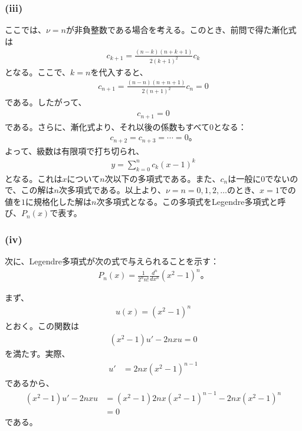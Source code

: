 \documentclass[platex,dvipdfmx,a4paper]{jsarticle}
\newcommand{\ssum}[3]{\sum_{#1=#2}^#3}
\begin{document}
  \subsubsection*{(iii)}
  
  ここでは、$\nu=n$が非負整数である場合を考える。このとき、前問で得た漸化式は
  \begin{align*}
    c_{k+1}
    =
    \frac{(n-k)(n+k+1)}{2(k+1)^2}c_k
  \end{align*}
  となる。ここで、$k=n$を代入すると、
  \begin{align*}
    c_{n+1}
    =
    \frac{(n-n)(n+n+1)}{2(n+1)^2}c_n=0
  \end{align*}
  である。したがって、
  \begin{align*}
    c_{n+1}=0
  \end{align*}
  である。さらに、漸化式より、それ以後の係数もすべて$0$となる：
  \begin{align*}
    c_{n+2}=c_{n+3}=\cdots=0。
  \end{align*}
  よって、級数は有限項で打ち切られ、
  \begin{align*}
    y
    =
    \ssum{k}{0}{n}c_k(x-1)^k
  \end{align*}
  となる。これは$x$について$n$次以下の多項式である。また、$c_n$は一般に$0$でないので、この解は$n$次多項式である。以上より、$\nu=n=0,1,2,\ldots$のとき、$x=1$での値を$1$に規格化した解は$n$次多項式となる。この多項式をLegendre多項式と呼び、$P_n(x)$で表す。
  
  \subsubsection*{(iv)}
  
  次に、Legendre多項式が次の式で与えられることを示す：
  \begin{align*}
    P_n(x)=\frac{1}{2^n n!}\frac{d^n}{dx^n}(x^2-1)^n。\tag{*}
  \end{align*}
  
  まず、
  \begin{align*}
    u(x)=(x^2-1)^n
  \end{align*}
  とおく。この関数は
  \begin{align*}
    (x^2-1)u'-2nxu=0
  \end{align*}
  を満たす。実際、
  \begin{align*}
    u'
    &=2nx(x^2-1)^{n-1}
  \end{align*}
  であるから、
  \begin{align*}
    (x^2-1)u'-2nxu
    &=(x^2-1)2nx(x^2-1)^{n-1}-2nx(x^2-1)^n\\
    &=0
  \end{align*}
  である。
  
\end{document}
